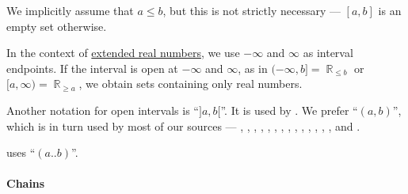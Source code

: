 \begin{comments}
  \item We implicitly assume that \( a \leq b \), but this is not strictly necessary --- \( [a, b] \) is an empty set otherwise.

  \item In the context of \hyperref[def:extended_real_numbers]{extended real numbers}, we use \( -\infty \) and \( \infty \) as interval endpoints. If the interval is open at \( -\infty \) and \( \infty \), as in \( (-\infty, b] = \BbbR_{\leq b} \) or \( [a, \infty) = \BbbR_{\geq a} \), we obtain sets containing only real numbers.

  \item Another notation for open intervals is \enquote{\( ]a, b[ \)}. It is used by . We prefer \enquote{\( (a, b) \)}, which is in turn used by most of our sources --- , , , , , , , , , , , ,  , ,  and .

   uses \enquote{\( (a..b) \)}.
\end{comments}

\paragraph{Chains}

